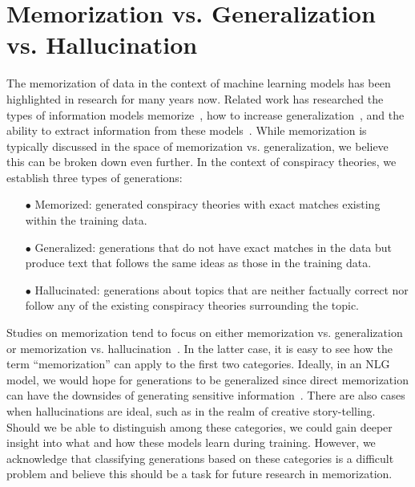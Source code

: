 \documentclass[11pt,a4paper]{article}
\begin{document}
\section{Memorization vs. Generalization vs. Hallucination}
The memorization of data in the context of machine learning models has been highlighted in research for many years now. Related work has researched the types of information models memorize~\cite{NEURIPS2020_1e14bfe2}, how to increase generalization~\cite{chatterjee2018learning}, and the ability to extract information from these models~\cite{carlini2020extracting}.  While memorization is typically discussed in the space of memorization vs. generalization, we believe this can be broken down even further. In the context of conspiracy theories, we establish three types of generations:
\begin{itemize}
  \item[$\bullet$] Memorized: generated conspiracy theories with exact matches existing within the training data.
  \item[$\bullet$] Generalized: generations that do not have exact matches in the data but produce text that follows the same ideas as those in the training data.
  \item[$\bullet$] Hallucinated: generations about topics that are neither factually correct nor follow any of the existing conspiracy theories surrounding the topic.
\end{itemize}
Studies on memorization tend to focus on either memorization vs. generalization or memorization vs. hallucination~\cite{nie-etal-2019-simple}. In the latter case, it is easy to see how the term ``memorization'' can apply to the first two categories. Ideally, in an NLG model, we would hope for generations to be generalized since direct memorization can have the downsides of generating sensitive information~\cite{carlini2019secret}. There are also cases when hallucinations are ideal, such as in the realm of creative story-telling. Should we be able to distinguish among these categories, we could gain deeper insight into what and how these models learn during training. However, we acknowledge that classifying generations based on these categories is a difficult problem and believe this should be a task for future research in memorization.
\end{document}
